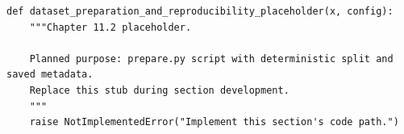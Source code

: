 \begin{lstlisting}[style=bookpython,caption={Planned code placeholder for dataset preparation and reproducibility.},label={lst:ch11-dataset-preparation-and-reproducibility}]
def dataset_preparation_and_reproducibility_placeholder(x, config):
    """Chapter 11.2 placeholder.

    Planned purpose: prepare.py script with deterministic split and saved metadata.
    Replace this stub during section development.
    """
    raise NotImplementedError("Implement this section's code path.")
\end{lstlisting}
